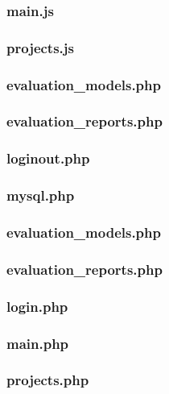 \documentclass[12pt,a4paper,spanish,twoside]{article}
\begin{document}
\subsubsection{main.js}

\subsubsection{projects.js}


\subsubsection{evaluation\_models.php}

\subsubsection{evaluation\_reports.php}

\subsubsection{loginout.php}

\subsubsection{mysql.php}


\subsubsection{evaluation\_models.php}

\subsubsection{evaluation\_reports.php}

\subsubsection{login.php}

\subsubsection{main.php}

\subsubsection{projects.php}

\end{document}
